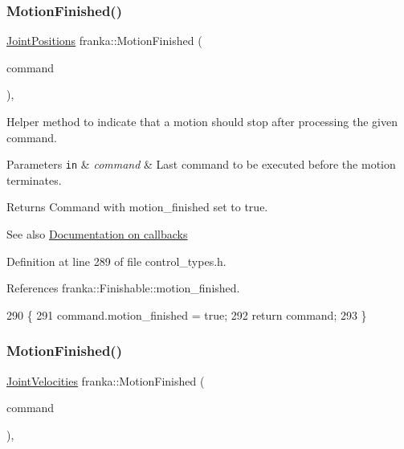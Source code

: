 \subsubsection{\texorpdfstring{Motion\+Finished()}{MotionFinished()}\hspace{0.1cm}{\footnotesize\ttfamily [2/5]}}
{\footnotesize\ttfamily \hyperlink{classfranka_1_1JointPositions}{Joint\+Positions} franka\+::\+Motion\+Finished (\begin{DoxyParamCaption}\item[{\hyperlink{classfranka_1_1JointPositions}{Joint\+Positions}}]{command }\end{DoxyParamCaption})\hspace{0.3cm}{\ttfamily [inline]}, {\ttfamily [noexcept]}}

Helper method to indicate that a motion should stop after processing the given command.


\begin{DoxyParams}[1]{Parameters}
\mbox{\tt in}  & {\em command} & Last command to be executed before the motion terminates.\\
\hline
\end{DoxyParams}
\begin{DoxyReturn}{Returns}
Command with motion\+\_\+finished set to true.
\end{DoxyReturn}
\begin{DoxySeeAlso}{See also}
\hyperlink{classfranka_1_1Robot_callback-docs}{Documentation on callbacks} 
\end{DoxySeeAlso}


Definition at line 289 of file control\+\_\+types.\+h.



References franka\+::\+Finishable\+::motion\+\_\+finished.


\begin{DoxyCode}
290                                      \{
291   command.motion\_finished = \textcolor{keyword}{true};
292   \textcolor{keywordflow}{return} command;
293 \}
\end{DoxyCode}
\mbox{\label{namespacefranka_ab478c128d691a46c0ab85bbf3b5caac5}} 
\subsubsection{\texorpdfstring{Motion\+Finished()}{MotionFinished()}\hspace{0.1cm}{\footnotesize\ttfamily [3/5]}}
{\footnotesize\ttfamily \hyperlink{classfranka_1_1JointVelocities}{Joint\+Velocities} franka\+::\+Motion\+Finished (\begin{DoxyParamCaption}\item[{\hyperlink{classfranka_1_1JointVelocities}{Joint\+Velocities}}]{command }\end{DoxyParamCaption})\hspace{0.3cm}{\ttfamily [inline]}, {\ttfamily [noexcept]}}

